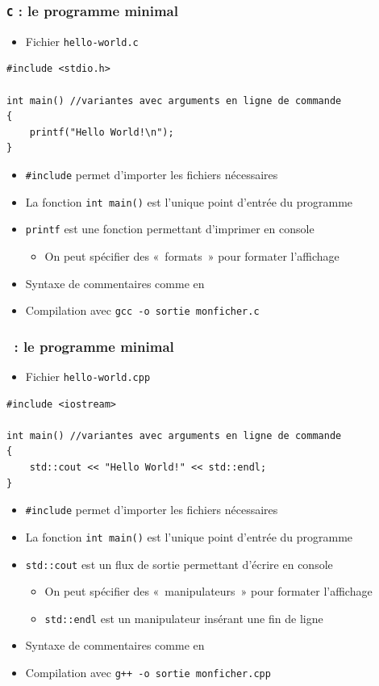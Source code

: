 \begin{frame}[containsverbatim]
\frametitle{\texttt{C} : le programme minimal}
\begin{itemize}
\item Fichier \texttt{hello-world.c}
\end{itemize}
\begin{lstlisting}
#include <stdio.h>

int main() //variantes avec arguments en ligne de commande
{
	printf("Hello World!\n");
}
\end{lstlisting}
\begin{itemize}
\item \lstinline|#include| permet d'importer les fichiers nécessaires
\item La fonction \lstinline|int main()| est l'unique point d'entrée du programme
\item \texttt{printf} est une fonction permettant d'imprimer en console
	\begin{itemize}
	\item On peut spécifier des «~formats~» pour formater l'affichage
	\end{itemize}
\item Syntaxe de commentaires comme en \java
\item Compilation avec \texttt{gcc -o sortie monficher.c}
\end{itemize}
\end{frame}

\begin{frame}[containsverbatim]
\frametitle{\cpp\ : le programme minimal}
\begin{itemize}
\item Fichier \texttt{hello-world.cpp}
\end{itemize}
\begin{lstlisting}
#include <iostream>

int main() //variantes avec arguments en ligne de commande
{
	std::cout << "Hello World!" << std::endl;
}
\end{lstlisting}
\begin{itemize}
\item \lstinline|#include| permet d'importer les fichiers nécessaires
\item La fonction \lstinline|int main()| est l'unique point d'entrée du programme
\item \texttt{std::cout} est un flux de sortie permettant d'écrire en console
	\begin{itemize}
	\item On peut spécifier des «~manipulateurs~» pour formater l'affichage
	\item \texttt{std::endl} est un manipulateur insérant une fin de ligne
	\end{itemize}
\item Syntaxe de commentaires comme en \java
\item Compilation avec \texttt{g++ -o sortie monficher.cpp}
\end{itemize}
\end{frame}

